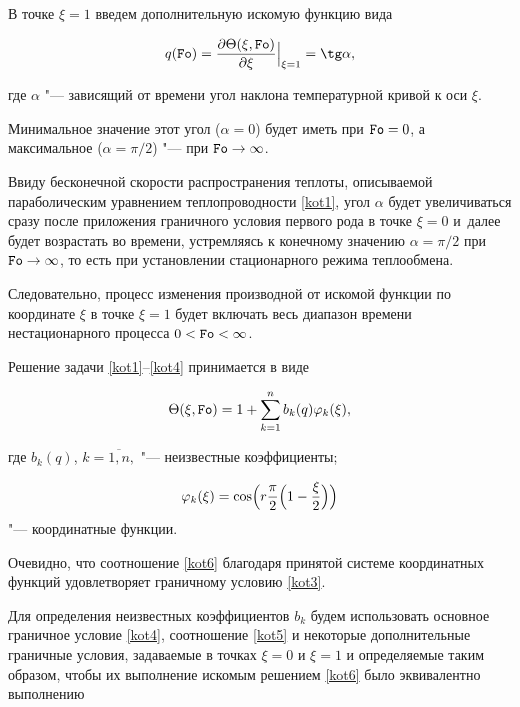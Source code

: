 В точке $\xi=1$ введем дополнительную искомую функцию вида

\begin{equation}

\label{kot5}

q(\mbox{\tt Fo})=\frac{\partial\Theta(\xi, \mbox{\tt Fo})}{\partial\xi}\Big|_{\xi=1}=\tg\alpha,

\end{equation}

где $\alpha$ "--- зависящий от времени угол наклона температурной кривой к оси $\xi$.

Минимальное значение этот угол ($\alpha=0$) будет иметь при $\mbox{\tt Fo}=0$, а максимальное ($\alpha=\pi/2$) "--- при $\mbox{\tt Fo}\to\infty$.



Ввиду бесконечной скорости распространения теплоты, описываемой параболическим уравнением теплопроводности \eqref{kot1}, угол $\alpha$ будет увеличиваться сразу после приложения граничного условия первого рода в точке $\xi=0$ и~далее будет возрастать во времени, устремляясь к конечному значению $\alpha=\pi/2$ при $\mbox{\tt Fo}\to\infty$, то есть при установлении стационарного режима теплообмена.

Следовательно, процесс изменения производной от искомой функции по координате $\xi$ в точке $\xi=1$ будет включать весь диапазон времени нестационарного процесса $0<\mbox{\tt Fo}<\infty$.



Решение задачи \eqref{kot1}--\eqref{kot4} принимается в виде

\begin{equation}

\label{kot6}

\Theta(\xi,\mbox{\tt Fo})=1+\sum\limits_{k=1}^n{b_k(q)\varphi_k(\xi)},

\end{equation}

где $b_k(q)$, $k=\overline{1, n},$ "--- неизвестные коэффициенты; 

$$\varphi_k(\xi)=\cos\Bigl(r\frac\pi 2\Bigl(1-\frac \xi2\Bigr)\Bigr)$$ "--- координатные функции.



Очевидно, что соотношение \eqref{kot6} благодаря принятой системе координатных функций удовлетворяет граничному условию \eqref{kot3}.

Для определения неизвестных коэффициентов $b_k$ будем использовать основное граничное условие \eqref{kot4}, соотношение \eqref{kot5} и некоторые дополнительные граничные условия, задаваемые в точках $\xi=0$ и $\xi=1$ и определяемые таким образом, чтобы их выполнение искомым решением \eqref{kot6} было эквивалентно выполнению 

